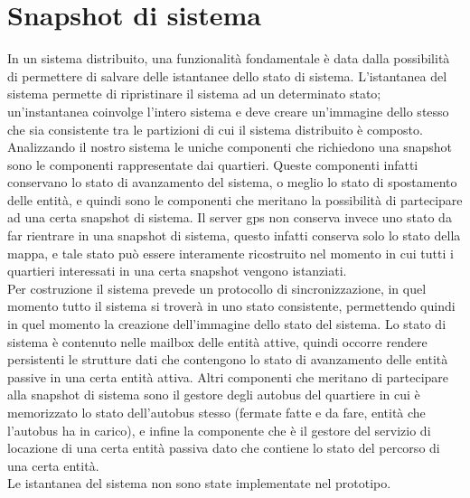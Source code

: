 \section{Snapshot di sistema}
In un sistema distribuito, una funzionalità fondamentale è data dalla possibilità di permettere di salvare delle istantanee dello stato di sistema. L'istantanea del sistema permette di ripristinare il sistema ad un determinato stato; un'instantanea coinvolge l'intero sistema e deve creare un'immagine dello stesso che sia consistente tra le partizioni di cui il sistema distribuito è composto. \\
Analizzando il nostro sistema le uniche componenti che richiedono una snapshot sono le componenti rappresentate dai quartieri. Queste componenti infatti conservano lo stato di avanzamento del sistema, o meglio lo stato di spostamento delle entità, e quindi sono le componenti che meritano la possibilità di partecipare ad una certa snapshot di sistema. Il server gps non conserva invece uno stato da far rientrare in una snapshot di sistema, questo infatti conserva solo lo stato della mappa, e tale stato può essere interamente ricostruito nel momento in cui tutti i quartieri interessati in una certa snapshot vengono istanziati. \\
Per costruzione il sistema prevede un protocollo di sincronizzazione, in quel momento tutto il sistema si troverà in uno stato consistente, permettendo quindi in quel momento la creazione dell'immagine dello stato del sistema. Lo stato di sistema è contenuto nelle mailbox delle entità attive, quindi occorre rendere persistenti le strutture dati che contengono lo stato di avanzamento delle entità passive in una certa entità attiva. Altri componenti che meritano di partecipare alla snapshot di sistema sono il gestore degli autobus del quartiere in cui è memorizzato lo stato dell'autobus stesso (fermate fatte e da fare, entità che l'autobus ha in carico), e infine la componente che è il gestore del servizio di locazione di una certa entità passiva dato che contiene lo stato del percorso di una certa entità.\\
Le istantanea del sistema non sono state implementate nel prototipo.